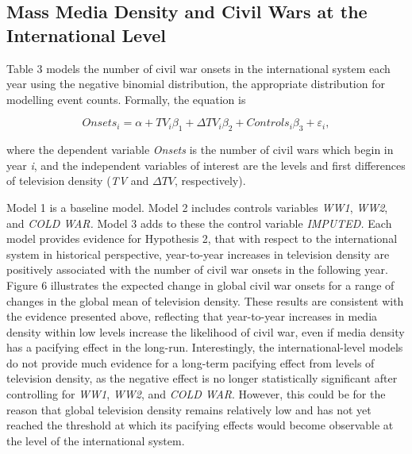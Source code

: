 \documentclass[12pt,article,oneside]{memoir}
\begin{document}
\subsection{Mass Media Density and Civil Wars at the International
Level}\label{mass-media-density-and-civil-wars-at-the-international-level}

Table 3 models the number of civil war onsets in the international
system each year using the negative binomial distribution, the
appropriate distribution for modelling event counts. Formally, the
equation is

\[ Onsets_{i} = \alpha + TV_{i} \beta_1 + \Delta TV_{i} \beta_2 + Controls_{i} \beta_3  + \varepsilon_{i}, \]

where the dependent variable \emph{Onsets} is the number of civil wars
which begin in year \emph{i}, and the independent variables of interest
are the levels and first differences of television density (\emph{TV}
and $\Delta TV$, respectively).

Model 1 is a baseline model. Model 2 includes controls variables
\emph{WW1}, \emph{WW2}, and \emph{COLD WAR.} Model 3 adds to these the
control variable \emph{IMPUTED.} Each model provides evidence for
Hypothesis 2, that with respect to the international system in
historical perspective, year-to-year increases in television density are
positively associated with the number of civil war onsets in the
following year. Figure 6 illustrates the expected change in global civil
war onsets for a range of changes in the global mean of television
density. These results are consistent with the evidence presented above,
reflecting that year-to-year increases in media density within low
levels increase the likelihood of civil war, even if media density has a
pacifying effect in the long-run. Interestingly, the international-level
models do not provide much evidence for a long-term pacifying effect
from levels of television density, as the negative effect is no longer
statistically significant after controlling for \emph{WW1}, \emph{WW2},
and \emph{COLD WAR}. However, this could be for the reason that global
television density remains relatively low and has not yet reached the
threshold at which its pacifying effects would become observable at the
level of the international system.
\end{document}
